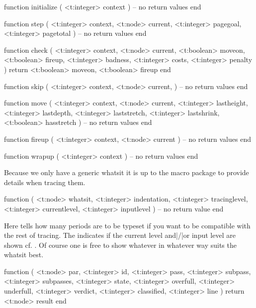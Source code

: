 \starttyping[option=LUA]
function initialize (
    <t:integer> context
)
    -- no return values
end
\stoptyping

\starttyping[option=LUA]
function step (
    <t:integer> context,
    <t:node>    current,
    <t:integer> pagegoal,
    <t:integer> pagetotal
)
    -- no return values
end
\stoptyping

\starttyping[option=LUA]
function check (
    <t:integer> context,
    <t:node>    current,
    <t:boolean> moveon,
    <t:boolean> fireup,
    <t:integer> badness,
    <t:integer> costs,
    <t:integer> penalty
)
    return <t:boolean> moveon, <t:boolean> fireup
end
\stoptyping

\starttyping[option=LUA]
function skip (
    <t:integer> context,
    <t:node>    current,
)
    -- no return values
end
\stoptyping

\starttyping[option=LUA]
function move (
    <t:integer> context,
        <t:node>    current,
        <t:integer> lastheight,
        <t:integer> lastdepth,
        <t:integer> laststretch,
        <t:integer> lastshrink,
        <t:boolean> hasstretch
)
    -- no return values
end
\stoptyping

\starttyping[option=LUA]
function fireup (
    <t:integer> context,
    <t:node> current
)
    -- no return values
end
\stoptyping

\starttyping[option=LUA]
function wrapup (
    <t:integer> context
)
    -- no return values
end
\stoptyping

\stopsubsection

\startsubsection[title=show_whatsit]

Because we only have a generic whatsit it is up to the macro package to provide
details when tracing them.

\starttyping[option=LUA]
function (
    <t:node>    whatsit,
    <t:integer> indentation,
    <t:integer> tracinglevel,
    <t:integer> currentlevel,
    <t:integer> inputlevel
)
    -- no return value
end
\stoptyping

Here  tells how many periods are to be typeset if you want to
be compatible with the rest of tracing. The  indicates if the
current level and|/|or input level are shown cf. \type {\tracinglevels}. Of
course one is free to show whatever in whatever way suits the whatsit best.

\stopsubsection

\startsubsection[title=linebreak_quality]

\starttyping[option=LUA]
function (
    <t:node>    par,
    <t:integer> id,
    <t:integer> pass,
    <t:integer> subpass,
    <t:integer> subpasses,
    <t:integer> state,
    <t:integer> overfull,
    <t:integer> underfull,
    <t:integer> verdict,
    <t:integer> classified,
    <t:integer> line
)
    return <t:node> result
end
\stoptyping

